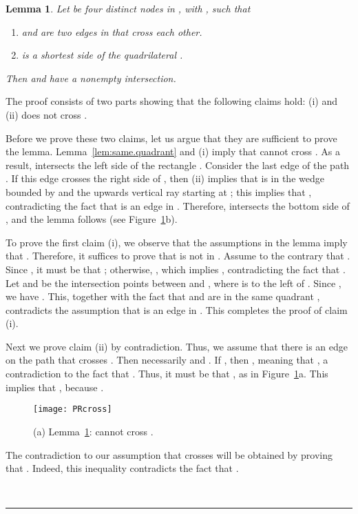 \pdfoutput=1  \documentclass[11pt]{article}
\newtheorem{lemma}{Lemma}
\newcommand{\qed}{\rule{0.5em}{1.5ex}}
\newcommand{\fqed}{{\hfill~\qed}}
\newenvironment{proof}{{\noindent \bf Proof.}}
                      {{\hfill \fqed} \vspace{1em}}
\begin{document}
\begin{lemma}
Let  be four distinct nodes in , with , such that
\begin{enumerate}
\item [(a)]  and
 are two edges in  that cross each other.
\item [(b)]  is a shortest side of the quadrilateral . \end{enumerate}
Then  and  have a nonempty intersection.
\label{lem:ec1}
\end{lemma}
\begin{proof}
The proof consists of two parts showing that the following claims hold:
(i)  and (ii)  does not cross .

Before we prove these two claims, let us argue that they are sufficient
to prove the lemma. Lemma~\ref{lem:same.quadrant} and (i) imply that
 cannot cross . As a result,
 intersects the left side of the rectangle .
Consider the last edge  of the path
. If this edge crosses the right side of ,
then (ii) implies that  is in the wedge bounded by  and the upwards
vertical ray starting at ; this implies that , contradicting
the fact that  is an edge in . Therefore,
 intersects the bottom side of , and the lemma
follows (see Figure~\ref{fig:PRcross}b).

To prove the first claim (i), we observe that the assumptions in the lemma imply
that . Therefore, it suffices to prove that 
is not in . Assume to the contrary that . Since
, it must be that ; otherwise, ,
which implies , contradicting the fact that
. Let  and  be the
intersection points between  and , where  is to
the left of .
Since , we have . This,
together with the fact that  and  are in the same quadrant ,
contradicts the assumption that  is an edge in .
This completes the proof of claim (i).

Next we prove claim (ii) by contradiction.
Thus, we assume that there is an edge  on the path
 that crosses . Then necessarily
 and .
If , then , meaning that
, a contradiction to the fact that .
Thus, it must be that , as in Figure~\ref{fig:PRcross}a.
This implies that , because .

\begin{figure}[htbp]
\centering
\texttt{[image: PRcross]}
\caption{(a) Lemma~\ref{lem:ec1}:  cannot cross .}
\label{fig:PRcross}
\end{figure}


The contradiction to our assumption that  crosses 
will be obtained by proving that . Indeed, this inequality
contradicts the fact that .


\end{proof}
\end{document}
